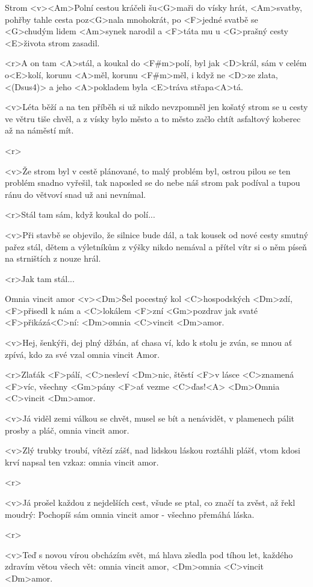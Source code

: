 \begin{song}[Ozvěna]{88}{Strom}{}
	<v><Am>Polní cestou kráčeli šu<G>maři do vísky hrát,
	<Am>svatby, pohřby tahle cesta poz<G>nala mnohokrát,
	po <F>jedné svatbě se <G>chudým lidem <Am>synek narodil
	a <F>táta mu u <G>prašný cesty <E>života strom zasadil.

	<r>A on tam <A>stál, a koukal do <F#m>polí,
	byl jak <D>král, sám v celém o<E>kolí,
	korunu <A>měl, korunu <F#m>měl, i když ne <D>ze zlata,<(Dsus4)>
	a jeho <A>pokladem byla <E>tráva střapa<A>tá.

	<v>Léta běží a na ten příběh si už nikdo nevzpomněl
	jen košatý strom se u cesty ve větru tiše chvěl,
	a z vísky bylo město a to město začlo chtít
	asfaltový koberec až na náměstí mít.

	<r>

	<v>Že strom byl v cestě plánované, to malý problém byl,
	ostrou pilou se ten problém snadno vyřešil,
	tak naposled se do nebe náš strom pak podíval
	a tupou ránu do větvoví snad už ani nevnímal.

	<r>Stál tam sám, když koukal do polí...

	<v>Při stavbě se objevilo, že silnice bude dál,
	a tak kousek od nové cesty smutný pařez stál,
	dětem a výletníkům z výšky nikdo nemával
	a přítel vítr si o něm píseň na strništích z nouze hrál.

	<r>Jak tam stál...
\end{song}

\begin{song}[Klíč]{89}{Omnia vincit amor}{}
	<v><Dm>Šel pocestný kol <C>hospodských <Dm>zdí,
	<F>přisedl k nám a <C>lokálem <F>zní
	<Gm>pozdrav jak svaté <F>přikázá<C>ní:
	<Dm>omnia <C>vincit <Dm>amor.

	<v>Hej, šenkýři, dej plný džbán,
	ať chasa ví, kdo k stolu je zván,
	se mnou ať zpívá, kdo za své vzal
	omnia vincit Amor.

	<r>Zlaťák <F>pálí, <C>nesleví <Dm>nic,
	štěstí <F>v lásce <C>znamená <F>víc,
	všechny <Gm>pány <F>ať vezme <C>ďas!<A>
	<Dm>Omnia <C>vincit <Dm>amor.

	<v>Já viděl zemi válkou se chvět,
	musel se bít a nenávidět,
	v plamenech pálit prosby a pláč,
	omnia vincit amor.

	<v>Zlý trubky troubí, vítězí zášť,
	nad lidskou láskou roztáhli plášť,
	vtom kdosi krví napsal ten vzkaz:
	omnia vincit amor.

	<r>

	<v>Já prošel každou z nejdelších cest,
	všude se ptal, co značí ta zvěst,
	až řekl moudrý: Pochopíš sám
	omnia vincit amor - všechno přemáhá láska.

	<r>

	<v>Teď s novou vírou obcházím svět,
	má hlava zšedla pod tíhou let,
	každého zdravím větou všech vět:
	omnia vincit amor,
	<Dm>omnia <C>vincit <Dm>amor.
\end{song}

